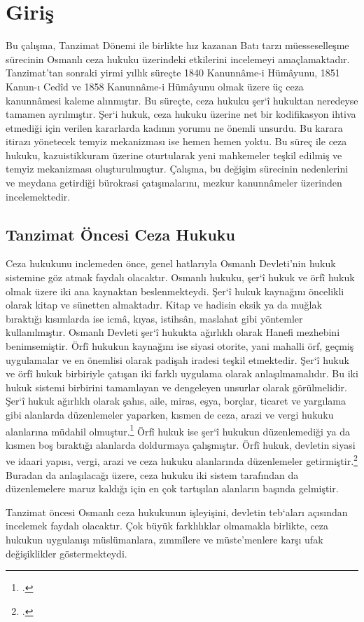 \section{Giriş}
\indent\indent Bu çalışma, Tanzimat Dönemi ile birlikte hız kazanan Batı tarzı müesseselleşme sürecinin Osmanlı ceza hukuku üzerindeki etkilerini incelemeyi amaçlamaktadır. Tanzimat'tan sonraki yirmi yıllık
süreçte 1840 Kanunnâme-i Hümâyunu, 1851 Kanun-ı Cedîd ve 1858 Kanunnâme-i Hümâyunu olmak üzere üç ceza kanunnâmesi kaleme alınmıştır. Bu süreçte, ceza hukuku şer`î hukuktan neredeyse tamamen 
ayrılmıştır. Şer`i hukuk, ceza hukuku üzerine net bir kodifikasyon ihtiva etmediği için verilen kararlarda kadının yorumu ne önemli unsurdu. Bu karara itirazı yönetecek temyiz mekanizması ise hemen hemen yoktu.
Bu süreç ile ceza hukuku, kazuistikkuram üzerine oturtularak yeni mahkemeler teşkil edilmiş ve temyiz mekanizması oluşturulmuştur. Çalışma, bu değişim sürecinin nedenlerini ve meydana getirdiği bürokrasi çatışmalarını, mezkur kanunnâmeler üzerinden incelemektedir.

\subsection{Tanzimat Öncesi Ceza Hukuku}

\indent\indent Ceza hukukunu inclemeden önce, genel hatlarıyla Osmanlı Devleti'nin hukuk sistemine göz atmak faydalı olacaktır. Osmanlı hukuku, şer`î hukuk ve örfî hukuk olmak üzere iki ana kaynaktan beslenmekteydi. 
Şer`î hukuk kaynağını öncelikli olarak kitap ve sünetten almaktadır. Kitap ve hadisin eksik ya da muğlak bıraktığı kısımlarda ise icmâ, kıyas, istihsân, maslahat gibi yöntemler kullanılmıştır. Osmanlı Devleti
şer`î hukukta ağırlıklı olarak Hanefi mezhebini benimsemiştir. Örfî hukukun kaynağını ise siyasi otorite, yani mahalli örf, geçmiş uygulamalar ve en önemlisi olarak padişah iradesi teşkil etmektedir.
Şer`î hukuk ve örfî hukuk birbiriyle çatışan iki farklı uygulama olarak anlaşılmamalıdır. Bu iki hukuk sistemi birbirini tamamlayan ve dengeleyen unsurlar olarak görülmelidir. Şer`î hukuk ağırlıklı olarak şahıs, aile, miras, eşya, borçlar,
ticaret ve yargılama gibi alanlarda düzenlemeler yaparken, kısmen de ceza, arazi ve vergi hukuku alanlarına müdahil olmuştur.\footcite[95]{osmanli_hukuku} Örfî hukuk ise şer`î hukukun düzenlemediği ya da kısmen boş bıraktığı alanlarda doldurmaya çalışmıştır. Örfî hukuk,
devletin siyasi ve idaari yapısı, vergi, arazi ve ceza hukuku alanlarında düzenlemeler getirmiştir.\footcite[97]{osmanli_hukuku} Buradan da anlaşılacağı üzere, ceza hukuku iki sistem tarafından da düzenlemelere maruz kaldığı için
en çok tartışılan alanların başında gelmiştir.

Tanzimat öncesi Osmanlı ceza hukukunun işleyişini, devletin teb`aları açısından incelemek faydalı olacaktır. Çok büyük farklılıklar olmamakla birlikte, ceza hukukun uygulanışı müslümanlara, zımmîlere ve müste'menlere karşı ufak
değişiklikler göstermekteydi.


